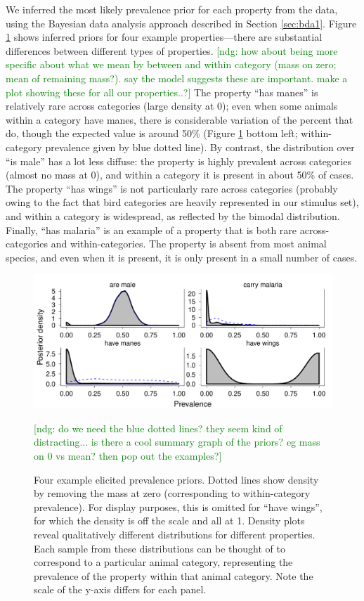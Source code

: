 \documentclass[10pt,letterpaper]{article}
\newcommand{\ndg}[1]{\textcolor{Green}{[ndg: #1]}}
\begin{document}
We inferred the most likely prevalence prior for each property from the data, using the Bayesian data analysis approach described in Section \ref{sec:bda1}.	
Figure \ref{fig:priors1a} shows inferred priors for four example properties---there are substantial differences between different types of properties. 
\ndg{how about being more specific about what we mean by between and within category (mass on zero; mean of remaining mass?). say the model suggests these are important. make a plot showing these for all our properties..?}
The property ``has manes'' is relatively rare across categories (large density at 0); even when some animals within a category have manes, there is considerable variation of the percent that do, though the expected value is around 50\% (Figure \ref{fig:priors1a} bottom left; within-category prevalence given by blue dotted line). 
By contrast, the distribution over ``is male'' has a lot less diffuse: the property is highly prevalent across categories (almost no mass at 0), and within a category it is present in about 50\% of cases.
The property ``has wings'' is not particularly rare across categories (probably owing to the fact that bird categories are heavily represented in our stimulus set), and within a category is widespread, as reflected by the bimodal distribution. 
Finally, ``has malaria'' is an example of a property that is both rare across-categories and within-categories. 
The property is absent from most animal species, and even when it is present, it is only present in a small number of cases.

\begin{figure}
\centering
    \includegraphics[width=0.8\columnwidth]{prevalence_priors_inferred-betas.pdf}
    \caption{Four example elicited prevalence priors. 
    Dotted lines show density by removing the mass at zero (corresponding to within-category prevalence). 
    For display purposes, this is omitted for ``have wings'', for which the density is off the scale and all at 1.
    Density plots reveal qualitatively different distributions for different properties. 
    Each sample from these distributions can be thought of to correspond to a particular animal category, representing the prevalence of the property within that animal category.
    Note the scale of the y-axis differs for each panel.}
    \ndg{do we need the blue dotted lines? they seem kind of distracting... is there a cool summary graph of the priors? eg mass on 0 vs mean? then pop out the examples?}
  \label{fig:priors1a}
\end{figure}
\end{document}
